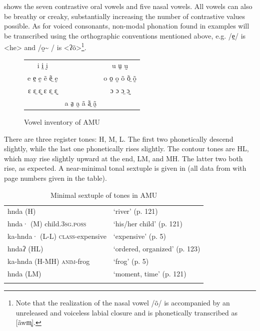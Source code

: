 \documentclass[output=paper]{langscibook}
\begin{document}
 shows the seven contrastive oral vowels and five nasal vowels. All vowels can also be breathy or creaky, substantially increasing the number of contrastive values possible. As for voiced consonants, non-modal phonation found in examples will be transcribed using the orthographic conventions mentioned above, e.g. /e̤/ is <he> and /o̰\~{}  / is <ʔõ>\footnote{Note that the realization of the nasal vowel /õ/ is accompanied by an unreleased and voiceless labial closure and is phonetically transcribed as [ãwm̥].}.


\begin{figure}
\begin{tabular}{ccc}
{ i i̤ ḭ}  &  & {          u ṳ ṵ} \\
{      e e̤ ḛ ẽ ẽ̤ ḛ}  &  & { o o̤ o̰ õ õ̤ õ̰} \\
{ ɛ ɛ̤ ɛ̰ ɛ ɛ̤ ɛ̰} &  & {        ɔ ɔ ɔ̤ ɔ̰}\\
& { a a̤ a̰ ã ã̤ ã̰} &
\end{tabular}
\caption{Vowel inventory of AMU}
\label{tabfig:dobui:2}
\end{figure}

There are three register tones: H, M, L. The first two phonetically descend slightly, while the last one phonetically rises slightly. The contour tones are HL, which may rise slightly upward at the end, LM, and MH. The latter two both rise, as expected. A near-minimal tonal sextuple is given in  (all data from \citet{Bauernschmidt2010} with page numbers given in the table).


\begin{table}
\begin{tabularx}{.66\textwidth}{Ql}
\lsptoprule
{ hnda (H)} & { ‘river’ (p. 121)}\\
\tablevspace
{ hnda· (M)}\newline
     {child.\textsc{3sg.poss}} & { ‘his/her child’ (p. 121)}\\
\tablevspace
{ ka-hnda· (L-L)}\newline
     \textsc{class}-expensive & { ‘expensive’ (p. 5)}\\
\tablevspace
{ hndaʔ (HL)} & { ‘ordered, organized’ (p. 123)}\\
\tablevspace
{ ka-hnda (H-MH)}\newline
     \textsc{anim}-frog & { ‘frog’ (p. 5)}\\
\tablevspace
{ hnda (LM)} & { ‘moment, time’ (p. 121)}\\
\lspbottomrule
\end{tabularx}
\caption{Minimal sextuple of tones in AMU}
\label{tab:dobui:3}
\end{table}
\end{document}
